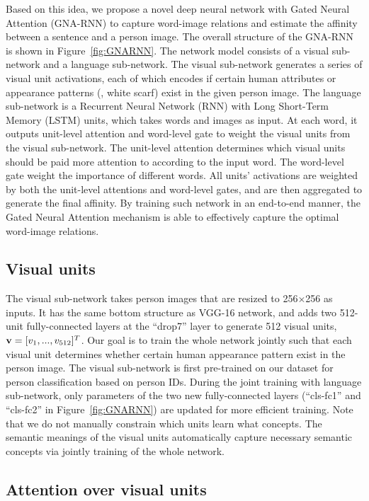 Based on this idea, we propose a novel deep neural network with Gated Neural Attention (GNA-RNN) to capture word-image relations and estimate the affinity between a sentence and a person image.
The overall structure of the GNA-RNN is shown in Figure~\ref{fig:GNARNN}. The network model consists of a visual sub-network and a language sub-network. The visual sub-network generates a series of visual unit activations, each of which encodes if  certain human attributes or appearance patterns (\eg, white scarf) exist in the given person image. The language sub-network is a Recurrent Neural Network (RNN) with Long Short-Term Memory (LSTM) units, which takes words and images as input. At each word, it outputs unit-level attention and word-level gate to weight the visual units from the visual sub-network. The unit-level attention determines which visual units should be paid more attention to according to the input word. 
The word-level gate weight the importance of different words. 
All units' activations are weighted by both the unit-level attentions and word-level gates, and are then aggregated to generate the final affinity. By training such network in an end-to-end manner, the Gated Neural Attention mechanism is able to effectively capture the optimal word-image relations.

\subsection{Visual units}

The visual sub-network takes person images that are resized to 256$\times$256 as inputs. It has the same bottom structure as VGG-16 network, and adds two 512-unit fully-connected layers at the ``drop7'' layer to generate 512 visual units, ${\bf v} = [v_1,...,v_{512}]^T$. Our goal is to train the whole network jointly such that each visual unit determines whether certain human appearance pattern exist in the person image. 
The visual sub-network is first pre-trained on our dataset for person classification based on person IDs. During the joint training with language sub-network, only parameters of the two new fully-connected layers (``cls-fc1'' and ``cls-fc2'' in Figure~\ref{fig:GNARNN}) are updated for more efficient training.
Note that we do not manually constrain which units learn what concepts. The semantic meanings of the visual units automatically capture necessary semantic concepts via jointly training of the whole network.


\subsection{Attention over visual units}
\label{sec:neuralattention}

